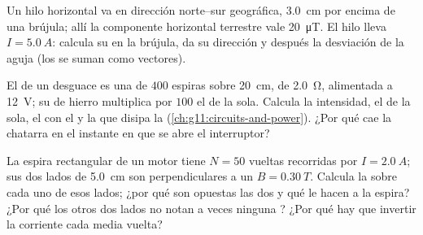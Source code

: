 \begin{exercise}[$\star\star\star$]\label{exo:g11:magnetic-fields:12}
Un hilo horizontal va en dirección norte--sur geográfica, \qty{3.0}{cm}
por encima de una brújula; allí la componente horizontal terrestre vale
\qty{20}{\micro T}. El hilo lleva $I = \qty{5.0}{A}$: calcula su 
en la brújula, da su dirección y después la desviación de la aguja (los
 se suman como vectores).
\end{exercise}

\begin{exercise}[$\star\star\star$]\label{exo:g11:magnetic-fields:13}
El  de un desguace es una  de $400$ espiras sobre
\qty{20}{cm}, de  \qty{2.0}{\ohm}, alimentada a \qty{12}{V};
su  de hierro multiplica por $100$ el  de la  sola.
Calcula la intensidad, el  de la  sola, el  con el
 y la  que disipa la 
(\cref{ch:g11:circuits-and-power}). ¿Por qué cae la chatarra en el
instante en que se abre el interruptor?
\end{exercise}

\begin{exercise}[$\star\star\star$]\label{exo:g11:magnetic-fields:14}
La espira rectangular de un motor tiene $N = 50$ vueltas recorridas por
$I = \qty{2.0}{A}$; sus dos lados de \qty{5.0}{cm} son perpendiculares a
un  $B = \qty{0.30}{T}$. Calcula la  sobre cada uno de esos
lados; ¿por qué son opuestas las dos  y qué le hacen a la espira?
¿Por qué los otros dos lados no notan a veces ninguna ? ¿Por qué
hay que invertir la corriente cada media vuelta?
\end{exercise}

